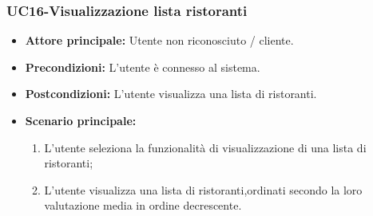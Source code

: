 \subsubsection{UC16-Visualizzazione lista ristoranti}
\begin{itemize}
\item \textbf{Attore principale:} Utente non riconosciuto / cliente.
\item \textbf{Precondizioni:} L'utente è connesso al sistema.
\item \textbf{Postcondizioni:} L'utente visualizza una lista di ristoranti.
\item \textbf{Scenario principale:}
\begin{enumerate}
    \item L'utente seleziona la funzionalità di visualizzazione di una lista di ristoranti;
    \item L'utente visualizza una lista di ristoranti,ordinati secondo la loro valutazione media in ordine decrescente.
\end{enumerate}
\end{itemize}

